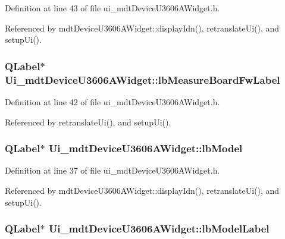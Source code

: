 Definition at line 43 of file ui\-\_\-mdt\-Device\-U3606\-A\-Widget.\-h.



Referenced by mdt\-Device\-U3606\-A\-Widget\-::display\-Idn(), retranslate\-Ui(), and setup\-Ui().

\hypertarget{class_ui__mdt_device_u3606_a_widget_a495247df2ff7229a0f199926bafbc1d2}{
\subsubsection[{lb\-Measure\-Board\-Fw\-Label}]{\setlength{\rightskip}{0pt plus 5cm}Q\-Label$\ast$ Ui\-\_\-mdt\-Device\-U3606\-A\-Widget\-::lb\-Measure\-Board\-Fw\-Label}}\label{class_ui__mdt_device_u3606_a_widget_a495247df2ff7229a0f199926bafbc1d2}


Definition at line 42 of file ui\-\_\-mdt\-Device\-U3606\-A\-Widget.\-h.



Referenced by retranslate\-Ui(), and setup\-Ui().

\hypertarget{class_ui__mdt_device_u3606_a_widget_a9d84ce92d16a709a163a6621e6b8a1ee}{
\subsubsection[{lb\-Model}]{\setlength{\rightskip}{0pt plus 5cm}Q\-Label$\ast$ Ui\-\_\-mdt\-Device\-U3606\-A\-Widget\-::lb\-Model}}\label{class_ui__mdt_device_u3606_a_widget_a9d84ce92d16a709a163a6621e6b8a1ee}


Definition at line 37 of file ui\-\_\-mdt\-Device\-U3606\-A\-Widget.\-h.



Referenced by mdt\-Device\-U3606\-A\-Widget\-::display\-Idn(), retranslate\-Ui(), and setup\-Ui().

\hypertarget{class_ui__mdt_device_u3606_a_widget_a78afbde880c66d87423a21efce6f6002}{
\subsubsection[{lb\-Model\-Label}]{\setlength{\rightskip}{0pt plus 5cm}Q\-Label$\ast$ Ui\-\_\-mdt\-Device\-U3606\-A\-Widget\-::lb\-Model\-Label}}\label{class_ui__mdt_device_u3606_a_widget_a78afbde880c66d87423a21efce6f6002}


